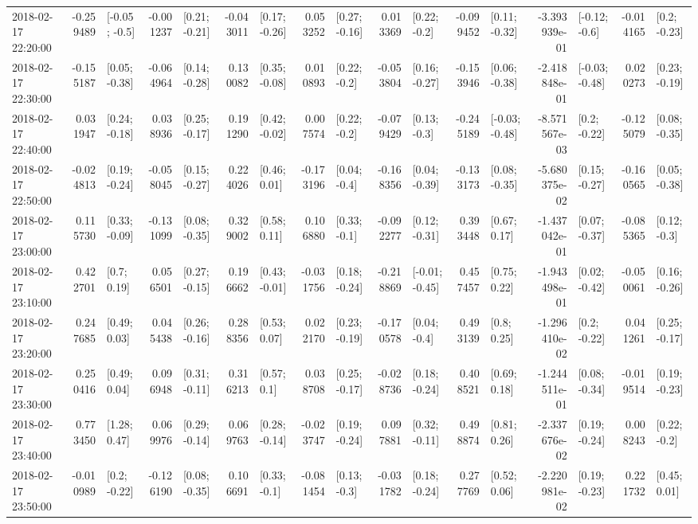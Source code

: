 \begin{tabular}{lrlrlrlrlrlrlrlrl}
2018-02-17 22:20:00 & -0.259489 &   [-0.05; -0.5] & -0.001237 &   [0.21; -0.21] & -0.043011 &   [0.17; -0.26] &  0.053252 &   [0.27; -0.16] &  0.013369 &    [0.22; -0.2] & -0.099452 &   [0.11; -0.32] & -3.393939e-01 &   [-0.12; -0.6] & -0.014165 &    [0.2; -0.23] \\
2018-02-17 22:30:00 & -0.155187 &   [0.05; -0.38] & -0.064964 &   [0.14; -0.28] &  0.130082 &   [0.35; -0.08] &  0.010893 &    [0.22; -0.2] & -0.053804 &   [0.16; -0.27] & -0.153946 &   [0.06; -0.38] & -2.418848e-01 &  [-0.03; -0.48] &  0.020273 &   [0.23; -0.19] \\
2018-02-17 22:40:00 &  0.031947 &   [0.24; -0.18] &  0.038936 &   [0.25; -0.17] &  0.191290 &   [0.42; -0.02] &  0.007574 &    [0.22; -0.2] & -0.079429 &    [0.13; -0.3] & -0.245189 &  [-0.03; -0.48] & -8.571567e-03 &    [0.2; -0.22] & -0.125079 &   [0.08; -0.35] \\
2018-02-17 22:50:00 & -0.024813 &   [0.19; -0.24] & -0.058045 &   [0.15; -0.27] &  0.224026 &    [0.46; 0.01] & -0.173196 &    [0.04; -0.4] & -0.168356 &   [0.04; -0.39] & -0.133173 &   [0.08; -0.35] & -5.680375e-02 &   [0.15; -0.27] & -0.160565 &   [0.05; -0.38] \\
2018-02-17 23:00:00 &  0.115730 &   [0.33; -0.09] & -0.131099 &   [0.08; -0.35] &  0.329002 &    [0.58; 0.11] &  0.106880 &    [0.33; -0.1] & -0.092277 &   [0.12; -0.31] &  0.393448 &    [0.67; 0.17] & -1.437042e-01 &   [0.07; -0.37] & -0.085365 &    [0.12; -0.3] \\
2018-02-17 23:10:00 &  0.422701 &     [0.7; 0.19] &  0.056501 &   [0.27; -0.15] &  0.196662 &   [0.43; -0.01] & -0.031756 &   [0.18; -0.24] & -0.218869 &  [-0.01; -0.45] &  0.457457 &    [0.75; 0.22] & -1.943498e-01 &   [0.02; -0.42] & -0.050061 &   [0.16; -0.26] \\
2018-02-17 23:20:00 &  0.247685 &    [0.49; 0.03] &  0.045438 &   [0.26; -0.16] &  0.288356 &    [0.53; 0.07] &  0.022170 &   [0.23; -0.19] & -0.170578 &    [0.04; -0.4] &  0.493139 &     [0.8; 0.25] & -1.296410e-02 &    [0.2; -0.22] &  0.041261 &   [0.25; -0.17] \\
2018-02-17 23:30:00 &  0.250416 &    [0.49; 0.04] &  0.096948 &   [0.31; -0.11] &  0.316213 &     [0.57; 0.1] &  0.038708 &   [0.25; -0.17] & -0.028736 &   [0.18; -0.24] &  0.408521 &    [0.69; 0.18] & -1.244511e-01 &   [0.08; -0.34] & -0.019514 &   [0.19; -0.23] \\
2018-02-17 23:40:00 &  0.773450 &    [1.28; 0.47] &  0.069976 &   [0.29; -0.14] &  0.069763 &   [0.28; -0.14] & -0.023747 &   [0.19; -0.24] &  0.097881 &   [0.32; -0.11] &  0.498874 &    [0.81; 0.26] & -2.337676e-02 &   [0.19; -0.24] &  0.008243 &    [0.22; -0.2] \\
2018-02-17 23:50:00 & -0.010989 &    [0.2; -0.22] & -0.126190 &   [0.08; -0.35] &  0.106691 &    [0.33; -0.1] & -0.081454 &    [0.13; -0.3] & -0.031782 &   [0.18; -0.24] &  0.277769 &    [0.52; 0.06] & -2.220981e-02 &   [0.19; -0.23] &  0.221732 &    [0.45; 0.01] \\
\bottomrule
\end{tabular}
